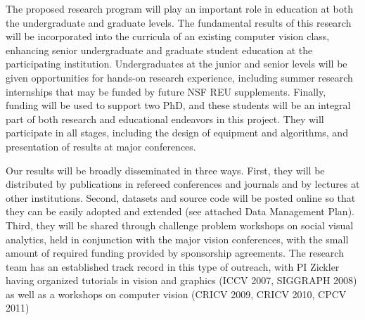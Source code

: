 The proposed research program will play an important role in education at both the undergraduate and graduate levels. The fundamental results of this research will be incorporated into the curricula of an existing computer vision class, enhancing senior undergraduate and graduate student education at the participating institution. Undergraduates at the junior and senior levels will be given opportunities for hands-on research experience, including summer research internships that may be funded by future NSF REU supplements. Finally, funding will be used to support two PhD, and these students will be an integral part of both research and educational endeavors in this project. They will participate in all stages, including the design of equipment and algorithms, and presentation of results at major conferences.

Our results will be broadly disseminated in three ways. First, they will be distributed by publications in refereed conferences and journals and by lectures at other institutions.  Second, datasets and source code will be posted online so that they can be easily adopted and extended (see attached Data Management Plan). Third, they will be shared through  challenge problem workshops on social visual analytics, held in conjunction with the major  vision conferences, with the small amount of required funding provided by sponsorship agreements. The research team has an established track record in this type of outreach, with PI Zickler having organized tutorials in  vision and  graphics (ICCV 2007, SIGGRAPH 2008) as well as a workshops on computer vision (CRICV 2009, CRICV 2010, CPCV 2011)
